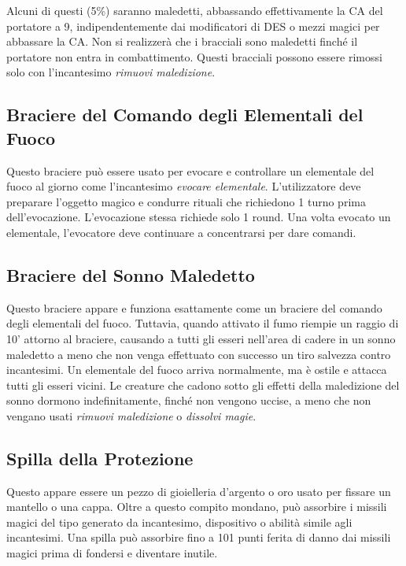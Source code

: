 \documentclass{article}
\begin{document}
\begin{multicols}{2}
\begin{table}[h]
\end{table}

Alcuni di questi (5\%) saranno maledetti, abbassando effettivamente la CA del portatore a 9, indipendentemente dai modificatori di DES o mezzi magici per abbassare la CA. Non si realizzerà che i bracciali sono maledetti finché il portatore non entra in combattimento. Questi bracciali possono essere rimossi solo con l'incantesimo \textit{rimuovi maledizione}.

\subsection{Braciere del Comando degli Elementali del Fuoco}
Questo braciere può essere usato per evocare e controllare un elementale del fuoco al giorno come l'incantesimo \textit{evocare elementale}. L'utilizzatore deve preparare l'oggetto magico e condurre rituali che richiedono 1 turno prima dell'evocazione. L'evocazione stessa richiede solo 1 round. Una volta evocato un elementale, l'evocatore deve continuare a concentrarsi per dare comandi.

\subsection{Braciere del Sonno Maledetto}
Questo braciere appare e funziona esattamente come un braciere del comando degli elementali del fuoco. Tuttavia, quando attivato il fumo riempie un raggio di 10' attorno al braciere, causando a tutti gli esseri nell'area di cadere in un sonno maledetto a meno che non venga effettuato con successo un tiro salvezza contro incantesimi. Un elementale del fuoco arriva normalmente, ma è ostile e attacca tutti gli esseri vicini. Le creature che cadono sotto gli effetti della maledizione del sonno dormono indefinitamente, finché non vengono uccise, a meno che non vengano usati \textit{rimuovi maledizione} o \textit{dissolvi magie}.

\subsection{Spilla della Protezione}
Questo appare essere un pezzo di gioielleria d'argento o oro usato per fissare un mantello o una cappa. Oltre a questo compito mondano, può assorbire i missili magici del tipo generato da incantesimo, dispositivo o abilità simile agli incantesimi. Una spilla può assorbire fino a 101 punti ferita di danno dai missili magici prima di fondersi e diventare inutile.


\end{multicols}
\end{document}
